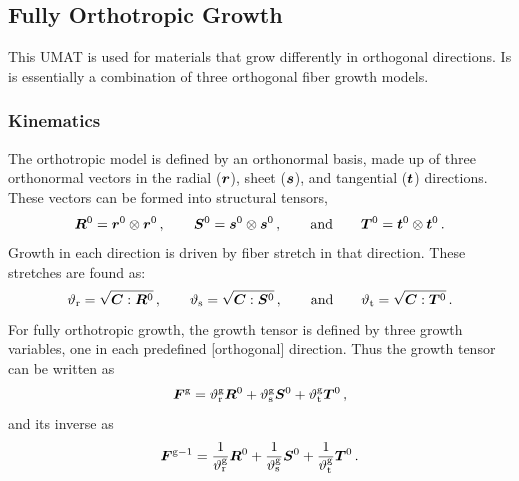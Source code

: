 \documentclass[10pt,letterpaper,oneside]{report}
\newcommand{\ten}[1]{\mbox{\boldmath $#1$}{}}
\newcommand{\scas}[1]{\mbox{{\scriptsize{${\rm{#1}}$}}}{}}
\begin{document}
\begin{itemize}
\subsection{Fully Orthotropic Growth}
This UMAT is used for materials that grow differently in orthogonal directions.  Is is essentially a combination of three orthogonal fiber growth models.  

\subsubsection{Kinematics}
The orthotropic model is defined by an orthonormal basis, made up of three orthonormal vectors in the radial ($\ten{r}$), sheet ($\ten{s}$), and tangential ($\ten{t}$) directions.  These vectors can be formed into structural tensors, 
\begin{equation}
\ten{R}^0 = \ten{r}^0 \otimes \ten{r}^0 \, , \qquad 
\ten{S}^0 = \ten{s}^0 \otimes \ten{s}^0 \, , \qquad \mbox{and} \qquad
\ten{T}^0 = \ten{t}^0 \otimes \ten{t}^0 \, . 
\end{equation}
Growth in each direction is driven by fiber stretch in that direction.  These stretches are found as: 
\begin{equation}
\vartheta_{\scas{r}} = \sqrt{ \ten{C} : \ten{R}^0 } \, , \qquad 
\vartheta_{\scas{s}} = \sqrt{ \ten{C} : \ten{S}^0 } \, , \qquad \mbox{and} \qquad
\vartheta_{\scas{t}} = \sqrt{ \ten{C} : \ten{T}^0 } \, . 
\end{equation}
For fully orthotropic growth, the growth tensor is defined by three growth variables, one in each predefined [orthogonal] direction.  Thus the growth tensor can be written as
\begin{equation}
\ten{F}^{\scas{g}} = \vartheta^{\scas{g}}_{\scas{r}}  \ten{R}^0 + \vartheta^{\scas{g}}_{\scas{s}} \ten{S}^0 + \vartheta^{\scas{g}}_{\scas{t}} \ten{T}^0 \, , 
\end{equation}
and its inverse as
\begin{equation}
\ten{F}^{\scas{g}-1} = \frac{1}{\vartheta^{\scas{g}}_{\scas{r}}}  \ten{R}^0 + \frac{1}{\vartheta^{\scas{g}}_{\scas{s}}} \ten{S}^0 + \frac{1}{\vartheta^{\scas{g}}_{\scas{t}}} \ten{T}^0 \, . 
\end{equation}


\end{itemize}
\end{document}
